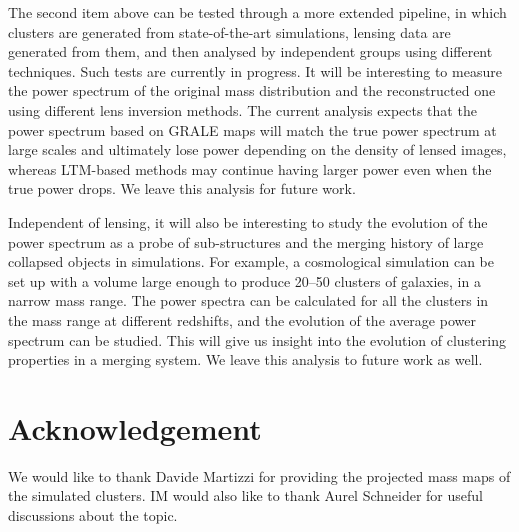 \documentclass[
  11pt,
  twoside,
  openright,
  titlepage,
  headings=optiontoheadandtoc
]{scrbook}
\begin{document}
The second item above can be tested through a more extended pipeline, in which clusters are generated from
state-of-the-art simulations, lensing data are generated from them, and then analysed by independent groups
using different techniques.  Such tests are currently in progress.
It will be interesting to measure the power
spectrum of the original mass distribution and the reconstructed one
using different lens inversion methods. %
The current analysis expects that the power spectrum based on GRALE maps
will match the true power spectrum at large scales and ultimately
lose power depending on the density of lensed images, whereas
LTM-based methods may continue having larger power even when the true power
drops. We leave this analysis for future work.

Independent of lensing, it will also be interesting to study the evolution of the power spectrum
as a probe of sub-structures and the merging history of large collapsed objects in simulations.
For example, a cosmological simulation can be set up with a volume large enough to produce
20--50 clusters of galaxies,  in a narrow mass range.  The power spectra can be calculated
for all the clusters in the mass range at different redshifts, and the evolution of the average
power spectrum can be studied. This will give us insight into the evolution of clustering
properties in a merging system. We leave this analysis to future work as well.






\section{Acknowledgement}

We would like to thank Davide Martizzi for providing the projected mass maps of the simulated clusters. 
IM would also like to thank Aurel Schneider for
useful discussions about the topic.
\end{document}
